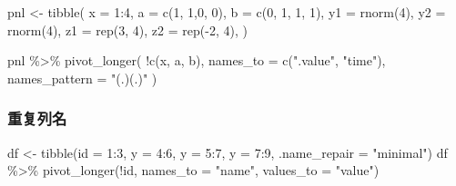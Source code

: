 \documentclass[
]{book}
\newenvironment{Shaded}{\begin{snugshade}}{\end{snugshade}}
\newcommand{\AttributeTok}[1]{\textcolor[rgb]{0.77,0.63,0.00}{#1}}
\newcommand{\DecValTok}[1]{\textcolor[rgb]{0.00,0.00,0.81}{#1}}
\newcommand{\FunctionTok}[1]{\textcolor[rgb]{0.00,0.00,0.00}{#1}}
\newcommand{\NormalTok}[1]{#1}
\newcommand{\OtherTok}[1]{\textcolor[rgb]{0.56,0.35,0.01}{#1}}
\newcommand{\SpecialCharTok}[1]{\textcolor[rgb]{0.00,0.00,0.00}{#1}}
\newcommand{\StringTok}[1]{\textcolor[rgb]{0.31,0.60,0.02}{#1}}
\begin{document}
\begin{Shaded}
\begin{Highlighting}[]
\NormalTok{pnl }\OtherTok{\textless{}{-}} \FunctionTok{tibble}\NormalTok{(}
  \AttributeTok{x =} \DecValTok{1}\SpecialCharTok{:}\DecValTok{4}\NormalTok{,}
  \AttributeTok{a =} \FunctionTok{c}\NormalTok{(}\DecValTok{1}\NormalTok{, }\DecValTok{1}\NormalTok{,}\DecValTok{0}\NormalTok{, }\DecValTok{0}\NormalTok{),}
  \AttributeTok{b =} \FunctionTok{c}\NormalTok{(}\DecValTok{0}\NormalTok{, }\DecValTok{1}\NormalTok{, }\DecValTok{1}\NormalTok{, }\DecValTok{1}\NormalTok{),}
  \AttributeTok{y1 =} \FunctionTok{rnorm}\NormalTok{(}\DecValTok{4}\NormalTok{),}
  \AttributeTok{y2 =} \FunctionTok{rnorm}\NormalTok{(}\DecValTok{4}\NormalTok{),}
  \AttributeTok{z1 =} \FunctionTok{rep}\NormalTok{(}\DecValTok{3}\NormalTok{, }\DecValTok{4}\NormalTok{),}
  \AttributeTok{z2 =} \FunctionTok{rep}\NormalTok{(}\SpecialCharTok{{-}}\DecValTok{2}\NormalTok{, }\DecValTok{4}\NormalTok{),}
\NormalTok{)}

\NormalTok{pnl }\SpecialCharTok{\%\textgreater{}\%} 
  \FunctionTok{pivot\_longer}\NormalTok{(}
    \SpecialCharTok{!}\FunctionTok{c}\NormalTok{(x, a, b), }
    \AttributeTok{names\_to =} \FunctionTok{c}\NormalTok{(}\StringTok{".value"}\NormalTok{, }\StringTok{"time"}\NormalTok{), }
    \AttributeTok{names\_pattern =} \StringTok{"(.)(.)"}
\NormalTok{  )}
\end{Highlighting}
\end{Shaded}

\hypertarget{ux91cdux590dux5217ux540d}{%
\subsubsection{重复列名}\label{ux91cdux590dux5217ux540d}}

\begin{Shaded}
\begin{Highlighting}[]
\NormalTok{df }\OtherTok{\textless{}{-}} \FunctionTok{tibble}\NormalTok{(}\AttributeTok{id =} \DecValTok{1}\SpecialCharTok{:}\DecValTok{3}\NormalTok{, }\AttributeTok{y =} \DecValTok{4}\SpecialCharTok{:}\DecValTok{6}\NormalTok{, }\AttributeTok{y =} \DecValTok{5}\SpecialCharTok{:}\DecValTok{7}\NormalTok{, }\AttributeTok{y =} \DecValTok{7}\SpecialCharTok{:}\DecValTok{9}\NormalTok{, }\AttributeTok{.name\_repair =} \StringTok{"minimal"}\NormalTok{)}
\NormalTok{df }\SpecialCharTok{\%\textgreater{}\%} \FunctionTok{pivot\_longer}\NormalTok{(}\SpecialCharTok{!}\NormalTok{id, }\AttributeTok{names\_to =} \StringTok{"name"}\NormalTok{, }\AttributeTok{values\_to =} \StringTok{"value"}\NormalTok{)}
\end{Highlighting}
\end{Shaded}
\end{document}
